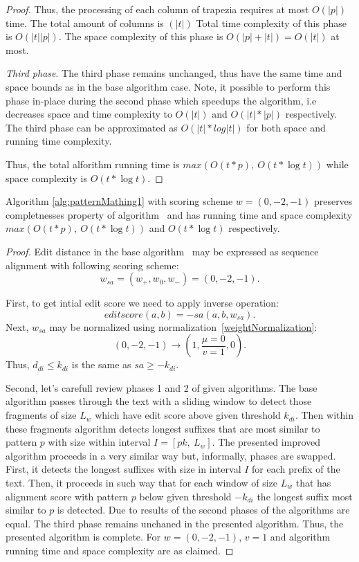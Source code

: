 \begin{proof}
Thus, the processing of each column of trapezia requires at most $O(|p|)$ time. The total amount of columns is $(|t|)$
Total time complexity of this phase is $O(|t||p|)$.
The space complexity of this phase is $O(|p|+|t|)=O(|t|)$ at most.

\emph{Third phase}.
The third phase remains unchanged, thus have the same time and space bounds as in the base algorithm case.
Note, it possible to perform this phase in-place during the second phase which speedups the algorithm, i.e decreases space and time complexity to $O(|t|)$ and $O(|t|*|p|)$ respectively.
The third phase can be approximated as $O(|t| * log|t|)$ for both space and running time complexity.

Thus, the total alforithm running time is $max(O(t * p),\ O(t * \log t))$ while space complexity is $O(t * \log t)$.
\end{proof}

\begin{theorem}
Algorithm \ref{alg:patternMathing1} with scoring scheme $w = (0,-2,-1)$ preserves completnesses property of algorithm~\cite{luciv2019interactive} and has running time and space complexity $max(O(t*p),\ O(t* \log t))$ and $O(t *  \log t)$  respectively.
\end{theorem}

\begin{proof}
Edit distance in the base algorithm~\cite{.} may be expressed as sequence alignment with following scoring scheme: 
$$w_{sa}=(w_{+},w_{0},w_{-}) = (0,-2,-1).$$

First, to get intial edit score we need to apply inverse operation:
$$editscore(a,b) = -sa(a,b,w_{sa}).$$
Next, $w_{sa}$ may be normalized using normalization~\ref{weightNormalization}:
$$(0, -2, -1) \rightarrow (1,\frac{\mu=0}{v=1}, 0).$$
Thus, $d_{di} \leq k_{di}$ is the same as $sa \geq -k_{di}$.

Second, let's carefull review phases 1 and 2 of given algorithms.
The base algorithm passes through the text with a sliding window to detect those fragments of size $L_{w}$ which have edit score above given threshold $k_{di}$.
Then within these fragments algorithm detects longest suffixes that are most similar to pattern $p$ with size within interval $I=[pk,\ L_{w}]$.
The presented improved algorithm proceeds in a very similar way but, informally, phases are swapped.
First, it detects the longest suffixes with size in interval $I$ for each prefix of the text.
Then, it proceeds in such way that for each window of size $L_{w}$ that has alignment score with pattern $p$ below given threshold $-k_{di}$  the longest suffix most similar to $p$ is detected.
Due to  results of the second phases of the algorithms are equal.
The third phase remains unchaned in the presented algorithm.
Thus, the presented algorithm is complete.
For $w = (0,-2,-1)$, $v=1$ and algorithm running time and space complexity are as claimed.
\end{proof}


